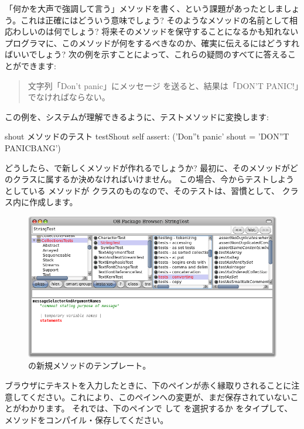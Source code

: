 \documentclass[a4paper,10pt,twoside]{book}
\begin{document}
「何かを大声で強調して言う」メソッドを書く、という課題があったとしましょう。これは正確にはどういう意味でしょう? そのようなメソッドの名前として相応わしいのは何でしょう? 将来そのメソッドを保守することになるかも知れないプログラマに、このメソッドが何をするべきなのか、確実に伝えるにはどうすればいいでしょう? 次の例を示すことによって、これらの疑問のすべてに答えることができます:

\begin{quote}
文字列「Don't panic」にメッセージ  を送ると、結果は「DON'T PANIC!」でなければならない。
\end{quote}

\noindent
この例を、システムが理解できるように、テストメソッドに変換します:

\begin{method}[testShout]{shout メソッドのテスト}
testShout
	self assert: ('Don''t panic' shout = 'DON''T PANICBANG')
\end{method} %

どうしたら、\pharo で新しくメソッドが作れるでしょうか? 最初に、そのメソッドがどのクラスに属するか決めなければいけません。
この場合、今からテストしようとしている  メソッドが  クラスのものなので、そのテストは、習慣として、 クラス内に作成します。

\begin{figure}[hbt]
\centerline {\includegraphics[width=\textwidth]{StringTest-newMethodTemplate}}
\caption{ の新規メソッドのテンプレート。
}
\end{figure}

ブラウザにテキストを入力したときに、下のペインが赤く縁取りされることに注意してください。これにより、このペインへの変更が、まだ保存されていないことがわかります。
それでは、下のペインで \actclick して  を選択するか  をタイプして、メソッドをコンパイル・保存してください。
\end{document}

